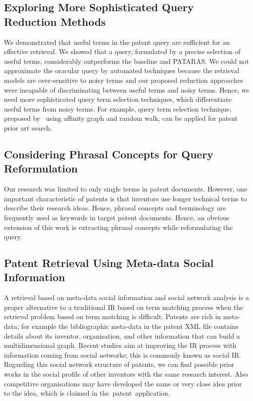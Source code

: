 \subsection{Exploring More Sophisticated Query Reduction Methods}
\label{subsec:SophisticatedQueryReduction}
We demonstrated that useful terms in the patent query are sufficient for an effective retrieval.
We showed that a query, formulated by a precise selection of useful terms, considerably outperforms the baseline and PATARAS. We could not approximate the oracular query by automated techniques 
because the retrieval models are over-sensitive to noisy terms and our proposed reduction approaches were incapable of discriminating between useful terms and noisy terms. 
Hence, we need more sophisticated query term selection techniques, which differentiate useful terms from noisy terms. 
For example, query term selection technique, proposed by~\cite{maxwell2013compact} using affinity graph and random walk, can be applied for patent prior art search.     

\subsection{Considering Phrasal Concepts for Query Reformulation }
\label{subsec: PhraseAnalysis}
Our research was limited to only single terms in patent documents. 
However, one important characteristic of patents is that 
inventors use longer technical terms to describe their research ideas. 
Hence, phrasal concepts and terminology 
are frequently used as keywords in target patent documents.
Hence, an obvious extension of this work is extracting phrasal concepts while reformulating the query. 

\subsection{Patent Retrieval Using Meta-data Social Information}
\label{subsec: Meta-dataNetworkAnalysis}
A retrieval based on meta-data social information and social network analysis 
is a proper alternative to a traditional IR based on term matching process 
when the retrieval problem based on term matching is difficult.
Patents are rich in meta-data; for example 
the bibliographic meta-data in the patent XML file contains details about 
its inventor, organisation, and other information that can build a multidimensional graph.
Recent studies aim at improving the IR process with
information coming from social networks; this is commonly known as social IR. 
Regarding this social network structure of patents, we can  
find possible prior works in the social profile of other inventors with the same research interest.
Also competitive organisations may have developed the same or very close idea prior to the  
idea, which is claimed in the~patent~application.


